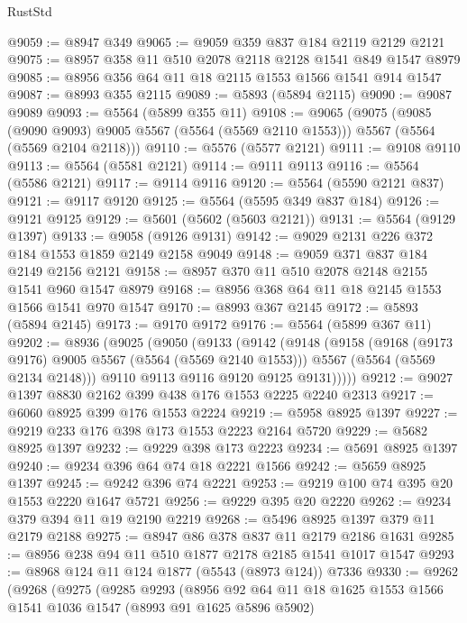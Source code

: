 \begin{lexlean}{RustStd}
\begin{coremodule}
@9059 := @8947 @349
@9065 := @9059 @359 @837 @184 @2119 @2129 @2121
@9075 := @8957 @358 @11 @510 @2078 @2118 @2128 @1541 @849 @1547 @8979
@9085 := @8956 @356 @64 @11 @18 @2115 @1553 @1566 @1541 @914 @1547
@9087 := @8993 @355 @2115
@9089 := @5893 (@5894 @2115)
@9090 := @9087 @9089
@9093 := @5564 (@5899 @355 @11)
@9108 := @9065
    (@9075
      (@9085 (@9090 @9093) @9005 @5567 (@5564 (@5569 @2110 @1553)))
      @5567
      (@5564 (@5569 @2104 @2118)))
@9110 := @5576 (@5577 @2121)
@9111 := @9108 @9110
@9113 := @5564 (@5581 @2121)
@9114 := @9111 @9113
@9116 := @5564 (@5586 @2121)
@9117 := @9114 @9116
@9120 := @5564 (@5590 @2121 @837)
@9121 := @9117 @9120
@9125 := @5564 (@5595 @349 @837 @184)
@9126 := @9121 @9125
@9129 := @5601 (@5602 (@5603 @2121))
@9131 := @5564 (@9129 @1397)
@9133 := @9058 (@9126 @9131)
@9142 := @9029 @2131 @226 @372 @184 @1553 @1859 @2149 @2158 @9049
@9148 := @9059 @371 @837 @184 @2149 @2156 @2121
@9158 := @8957 @370 @11 @510 @2078 @2148 @2155 @1541 @960 @1547 @8979
@9168 := @8956 @368 @64 @11 @18 @2145 @1553 @1566 @1541 @970 @1547
@9170 := @8993 @367 @2145
@9172 := @5893 (@5894 @2145)
@9173 := @9170 @9172
@9176 := @5564 (@5899 @367 @11)
@9202 := @8936
    (@9025
      (@9050
        (@9133
          (@9142
            (@9148
              (@9158
                (@9168 (@9173 @9176) @9005 @5567 (@5564 (@5569 @2140 @1553)))
                @5567
                (@5564 (@5569 @2134 @2148)))
              @9110
              @9113
              @9116
              @9120
              @9125
              @9131)))))
@9212 := @9027 @1397 @8830 @2162 @399 @438 @176 @1553 @2225 @2240 @2313
@9217 := @6060 @8925 @399 @176 @1553 @2224
@9219 := @5958 @8925 @1397
@9227 := @9219 @233 @176 @398 @173 @1553 @2223 @2164 @5720
@9229 := @5682 @8925 @1397
@9232 := @9229 @398 @173 @2223
@9234 := @5691 @8925 @1397
@9240 := @9234 @396 @64 @74 @18 @2221 @1566
@9242 := @5659 @8925 @1397
@9245 := @9242 @396 @74 @2221
@9253 := @9219 @100 @74 @395 @20 @1553 @2220 @1647 @5721
@9256 := @9229 @395 @20 @2220
@9262 := @9234 @379 @394 @11 @19 @2190 @2219
@9268 := @5496 @8925 @1397 @379 @11 @2179 @2188
@9275 := @8947 @86 @378 @837 @11 @2179 @2186 @1631
@9285 := @8956 @238 @94 @11 @510 @1877 @2178 @2185 @1541 @1017 @1547
@9293 := @8968 @124 @11 @124 @1877 (@5543 (@8973 @124)) @7336
@9330 := @9262
    (@9268
      (@9275
        (@9285
          @9293
          (@8956
            @92
            @64
            @11
            @18
            @1625
            @1553
            @1566
            @1541
            @1036
            @1547
            (@8993 @91 @1625 @5896 @5902)

\end{coremodule}
\end{lexlean}
